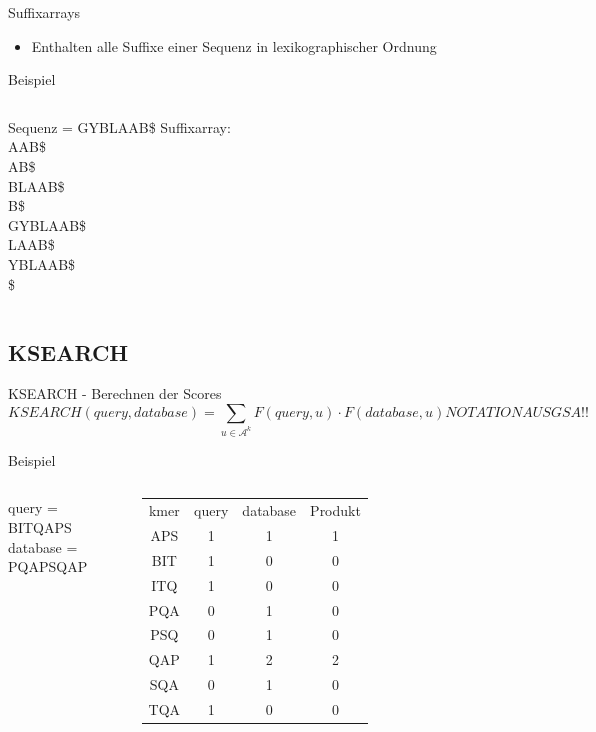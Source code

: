 \documentclass[xcolor=dvipsnames, aspectratio=1610]{beamer}
\begin{document}
\begin{frame}{Suffixarrays}
  \begin{itemize}
    \item Enthalten alle Suffixe einer Sequenz in lexikographischer Ordnung
  \end{itemize}
  \begin{block}{Beispiel}
    \begin{columns}
        Sequenz = GYBLAAB\$
      \scriptsize{}
        Suffixarray:\\
        AAB\$\\
        AB\$\\
        BLAAB\$\\
        B\$\\
        GYBLAAB\$\\
        LAAB\$\\
        YBLAAB\$\\
        \$\\
      \normalsize
    \end{columns}
  \end{block}
\end{frame}

\subsection{KSEARCH}

\begin{frame}{KSEARCH - Berechnen der Scores}
  \begin{equation*}
    KSEARCH(query,database) = \sum_{u \in \mathcal A^k} F(query,u) \cdot F(database,u) NOTATION AUS GSA!!
  \end{equation*}  
  \begin{block}{Beispiel}
    \begin{columns}
    query = BITQAPS\\
    database = PQAPSQAP\\  
    \scriptsize\begin{tabular}{cccc}
    kmer & query & database & Produkt\\
    APS & 1 & 1 & 1\\
    BIT & 1 & 0 & 0\\
    ITQ & 1 & 0 & 0 \\
    PQA & 0 & 1 & 0\\
    PSQ & 0 & 1 & 0\\
    QAP & 1 & 2 & 2\\
    SQA & 0 & 1 & 0\\
    TQA & 1 & 0 & 0\\    
    \end{tabular}
    \normalsize
    \end{columns}
  \end{block}
\end{frame}
\end{document}
